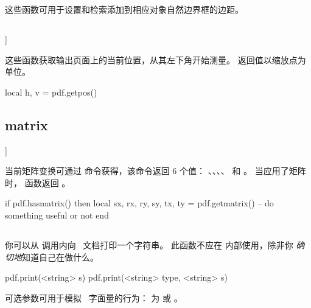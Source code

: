 这些函数可用于设置和检索添加到相应对象自然边界框的边距。

\subsection{{\type {get[pos|hpos|vpos}}}]



这些函数获取输出页面上的当前位置，从其左下角开始测量。
返回值以缩放点为单位。

\begin{typing}
local h, v = pdf.getpos()
\end{typing}

\subsection{{\type {[has|get}matrix}}]


 

当前矩阵变换可通过  命令获得，该命令返回 6 个值：
、、、、 和 。
当应用了矩阵时， 函数返回 。

\begin{typing}
if pdf.hasmatrix() then
    local sx, rx, ry, sy, tx, ty = pdf.getmatrix()
    -- do something useful or not
end
\end{typing}

\subsection{}



你可以从  调用内向 \PDF\ 文档打印一个字符串。
此函数不应在  内部使用，除非你 {\it 确切地}知道自己在做什么。

\begin{typing}
pdf.print(<string> s)
pdf.print(<string> type, <string> s)
\end{typing}

可选参数可用于模拟 \PDF\ 字面量的行为： 为 
或 。

\subsection{}


